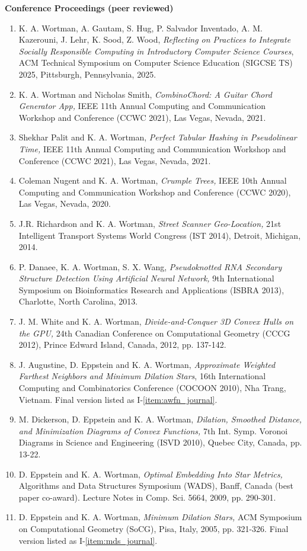 \documentclass[11pt]{letter}
\begin{document}
\renewcommand{\labelenumi}{C-\arabic{enumi}.}
\textbf{Conference Proceedings (peer reviewed)}
\begin{enumerate}
\item \label{item:sigcse25etal} K. A. Wortman, A. Gautam, S. Hug, P. Salvador Inventado, A. M. Kazerouni, J. Lehr, K. Sood, Z. Wood, \emph{Reflecting on Practices to Integrate Socially Responsible Computing in Introductory Computer Science Courses}, ACM Technical Symposium on Computer Science Education (SIGCSE TS) 2025, Pittsburgh, Pennsylvania, 2025.
\item \label{item:ccwc21smith} K. A. Wortman and Nicholas Smith, \emph{CombinoChord: A Guitar Chord Generator App,} IEEE 11th Annual Computing and Communication Workshop and Conference (CCWC 2021), Las Vegas, Nevada, 2021.
\item \label{item:ccwc21palit} Shekhar Palit and K. A. Wortman, \emph{Perfect Tabular Hashing in Pseudolinear Time,} IEEE 11th Annual Computing and Communication Workshop and Conference (CCWC 2021), Las Vegas, Nevada, 2021.
\item \label{item:ccwc20} Coleman Nugent and K. A. Wortman, \emph{Crumple Trees,} IEEE 10th Annual Computing and Communication Workshop and Conference (CCWC 2020), Las Vegas, Nevada, 2020.
\item \label{item:its14} J.R. Richardson and K. A. Wortman, \emph{Street Scanner Geo-Location,} 21st Intelligent Transport Systems World Congress (IST 2014), Detroit, Michigan, 2014.
\item \label{item:isbra13} P. Danaee, K. A. Wortman, S. X. Wang, \emph{Pseudoknotted RNA Secondary Structure Detection Using Artificial Neural Network,} 9th International Symposium on Bioinformatics Research and Applications (ISBRA 2013), Charlotte, North Carolina, 2013.
\item \label{item:cccg12} J. M. White and K. A. Wortman, \emph{Divide-and-Conquer 3D Convex Hulls on the GPU,} 24th Canadian Conference on Computational Geometry (CCCG 2012), Prince Edward Island, Canada, 2012, pp. 137-142.
\item \label{item:awfn_conference} J. Augustine, D. Eppstein and K. A. Wortman, \emph{Approximate Weighted Farthest Neighbors and Minimum Dilation Stars}, 16th International Computing and Combinatorics Conference (COCOON 2010), Nha Trang, Vietnam.  Final version listed as I-\ref{item:awfn_journal}.
\item M. Dickerson, D. Eppstein and K. A. Wortman, \emph{Dilation, Smoothed Distance, and Minimization Diagrams of Convex Functions,} 7th Int. Symp. Voronoi Diagrams in Science and Engineering (ISVD 2010), Quebec City, Canada, pp. 13-22.
\item \label{item:star_metrics} D. Eppstein and K. A. Wortman, \emph{Optimal Embedding Into Star Metrics,} Algorithms and Data Structures Symposium (WADS), Banff, Canada (best paper co-award).  Lecture Notes in Comp. Sci. 5664, 2009, pp. 290-301.
\item \label{item:mds_conference} D. Eppstein and K. A. Wortman, \emph{Minimum Dilation Stars,} ACM Symposium on Computational Geometry (SoCG), Pisa, Italy, 2005, pp. 321-326.  Final version listed as I-\ref{item:mds_journal}.
\end{enumerate}
\end{document}
